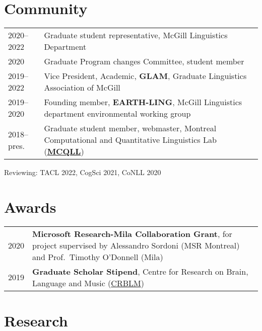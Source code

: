 \documentclass[11pt,a4paper]{article}
\begin{document}
  \section{Community}
  \begin{longtable}{p{1.7cm}|p{15cm}}
    \textsc{2020--2022}
    &%
    Graduate student representative, McGill Linguistics Department\\
    2020
    &%
    Graduate Program changes Committee, student member\\
    \textsc{2019--2022}
    &%
    Vice President, Academic, \textbf{GLAM}, Graduate Linguistics Association of
    McGill\\
    \textsc{2019--2020}&%
    Founding member, \textbf{EARTH-LING}, McGill Linguistics department
    environmental working group\\
    \textsc{2018--}pres.
    &%
    Graduate student member, webmaster, Montreal Computational and Quantitative
    Linguistics Lab (\href{http://mcqll.org}{\textbf{MCQLL}})\\
  \end{longtable}
  Reviewing: TACL 2022, CogSci 2021, CoNLL 2020

  \section{Awards}
  \begin{longtable}{p{1.7cm}|p{15cm}}
    \textsc{2020}&%
      \textbf{Microsoft Research-Mila Collaboration Grant}, for project
      supervised by Alessandro Sordoni (MSR Montreal) and Prof.\ Timothy
      O'Donnell (Mila)\\
    \textsc{2019}&%
      \textbf{Graduate Scholar Stipend}, Centre for Research on Brain, Language
      and Music (\href{https://crblm.ca/}{CRBLM})\\
  \end{longtable}

  \section{Research}
\end{document}
